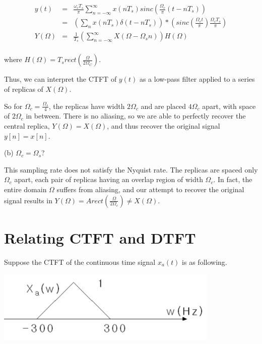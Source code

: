 \documentclass[11pt]{article}
\begin{document}
{\color{blue}
\begin{eqnarray*}
y(t) &=& \frac{ \omega_c T_s}{\pi} \sum_{n=-\infty}^\infty x(nT_s) sinc\left( \frac{\Omega_c}{\pi} (t-nT_s) \right) \\
&=& \left(\sum_n x(nT_s) \delta(t-nT_s) \right)*\left(sinc\left(\frac{\Omega_c t}{\pi}\right)\frac{\Omega_c T_s}{\pi} \right) \\
Y(\Omega) &=& \frac{1}{T_s} \left( \sum_{n=-\infty}^\infty X(\Omega - \Omega_s n) \right) H(\Omega)\\
\end{eqnarray*}

where $H(\Omega) = T_s rect(\frac{ \Omega}{2 \Omega_C})$.


Thus, we can interpret the CTFT of $y(t)$ as a low-pass filter applied to a series of replicas of $X(\Omega)$.

So for $\Omega_c = \frac{\Omega_s}{4}$, the replicas have width $2\Omega_c$ and are placed $4\Omega_c$ apart, with space of $2\Omega_c$ in between. There is no aliasing, so we are able to perfectly recover the central replica, $Y(\Omega) = X(\Omega)$, and thus recover the original signal $y[n]=x[n]$. 

}

(b) $\Omega_c = \Omega_s$?

{\color{blue}
This sampling rate does not satisfy the Nyquist rate. The replicas are spaced only $\Omega_c$ apart, each pair of replicas having an overlap region of width $\Omega_c$. In fact, the entire domain $\Omega$ suffers from aliasing, and our attempt to recover the original signal results in $Y(\Omega) = Arect\left(\frac{\Omega}{2\Omega_c} \right) \neq X(\Omega)$.
}

\section{Relating CTFT and DTFT}

Suppose the CTFT of the continuous time signal $x_a(t)$ is as following.

\includegraphics[width = 0.8\textwidth]{CTFT_p4.png} 
\end{document}

